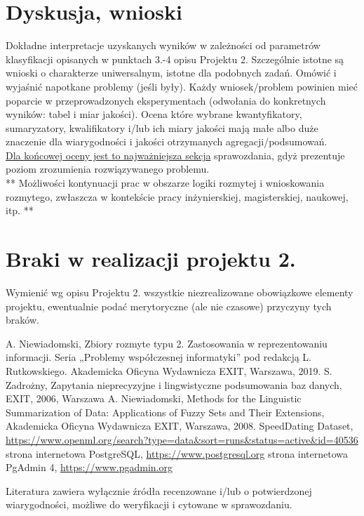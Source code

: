 \documentclass{classrep}
\begin{document}
\section{Dyskusja, wnioski}
Dokładne interpretacje uzyskanych wyników w zależności od parametrów klasyfikacji
opisanych w punktach 3.-4 opisu Projektu 2. 
Szczególnie istotne są wnioski o charakterze uniwersalnym, istotne dla podobnych zadań. 
Omówić i wyjaśnić napotkane problemy (jeśli były). Każdy wniosek/problem powinien mieć poparcie
w przeprowadzonych eksperymentach (odwołania do konkretnych wyników: tabel i miar
jakości). Ocena które wybrane kwantyfikatory, sumaryzatory, kwalifikatory i/lub ich
miary jakości mają małe albo duże znaczenie dla wiarygodności i jakości otrzymanych
agregacji/podsumowań.  \\
\underline{Dla końcowej oceny jest to najważniejsza sekcja} sprawozdania, gdyż prezentuje poziom
zrozumienia rozwiązywanego problemu.\\

** Możliwości kontynuacji prac w obszarze logiki rozmytej i wnioskowania rozmytego, zwłaszcza w kontekście pracy inżynierskiej,
magisterskiej, naukowej, itp. **\\



\section{Braki w realizacji projektu 2.}
Wymienić wg opisu Projektu 2. wszystkie niezrealizowane obowiązkowe elementy projektu, ewentualnie
podać merytoryczne (ale nie czasowe) przyczyny tych braków. 


\begin{thebibliography}{99}
  A. Niewiadomski, Zbiory rozmyte typu 2. Zastosowania w reprezentowaniu informacji.  Seria „Problemy współczesnej informatyki” pod redakcją L. Rutkowskiego. Akademicka Oficyna Wydawnicza EXIT, Warszawa, 2019.
 S. Zadrożny, Zapytania nieprecyzyjne i lingwistyczne podsumowania baz danych, EXIT, 2006, Warszawa
 A. Niewiadomski, Methods for the Linguistic Summarization of Data: Applications of Fuzzy Sets and Their Extensions, Akademicka Oficyna Wydawnicza EXIT, Warszawa, 2008.
 SpeedDating Dataset, \url{https://www.openml.org/search?type=data&sort=runs&status=active&id=40536}
 strona internetowa PostgreSQL, \url{https://www.postgresql.org}
 strona internetowa PgAdmin 4, \url{https://www.pgadmin.org}
\end{thebibliography}

Literatura zawiera wyłącznie źródła recenzowane i/lub o potwierdzonej wiarygodności,
możliwe do weryfikacji i cytowane w sprawozdaniu. 
\end{document}
